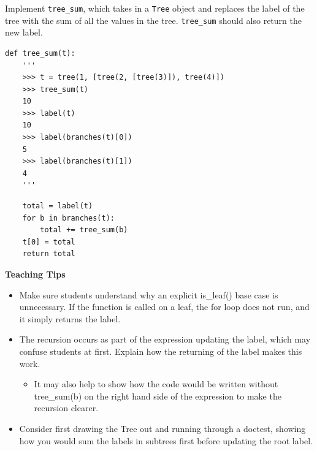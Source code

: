 \begin{blocksection}
\question Implement \lstinline{tree_sum}, which takes in a \lstinline{Tree}
object and replaces the label of the tree with the sum of all the values
in the tree. \lstinline{tree_sum} should also return the new label.

\begin{lstlisting}
def tree_sum(t):
    '''
    >>> t = tree(1, [tree(2, [tree(3)]), tree(4)])
    >>> tree_sum(t)
    10
    >>> label(t)
    10
    >>> label(branches(t)[0])
    5
    >>> label(branches(t)[1])
    4
    '''
\end{lstlisting}

\begin{solution}[1in]
\begin{lstlisting}
    total = label(t)
    for b in branches(t):
        total += tree_sum(b)
    t[0] = total
    return total
\end{lstlisting}
\end{solution}
\end{blocksection}

\begin{guide}
    \textbf{Teaching Tips}
    \begin{itemize}
        \item Make sure students understand why an explicit is\_leaf() base case is unnecessary. If the function is called on a leaf, the for loop does not run, and it simply returns the label.
        \item The recursion occurs as part of the expression updating the label, which may confuse students at first. Explain how the returning of the label makes this work.
        \begin{itemize}
            \item It may also help to show how the code would be written without tree\_sum(b) on the right hand side of the expression to make the recursion clearer.
        \end{itemize}
        \item Consider first drawing the Tree out and running through a doctest, showing how you would sum the labels in subtrees first before updating the root label.
    \end{itemize}
\end{guide}
    

